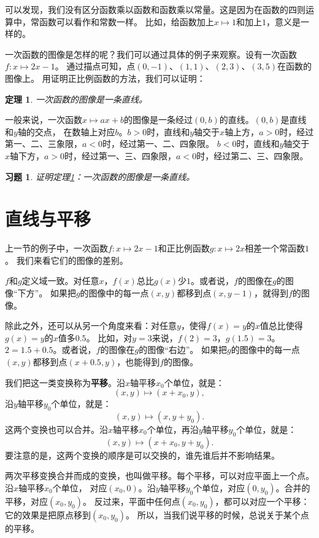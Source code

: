 \documentclass[12pt,UTF8]{ctexbook}
\newtheorem{tm}{定理}[section]
\newtheorem{xt}{习题}[section]
\begin{document}
可以发现，我们没有区分函数乘以函数和函数乘以常量。这是因为在函数的四则运算中，常函数可以看作和常数一样。
比如，给函数加上$x\mapsto 1$和加上$1$，意义是一样的。

一次函数的图像是怎样的呢？我们可以通过具体的例子来观察。设有一次函数$f: x\mapsto 2x - 1$。
通过描点可知，点$(0, -1)$、$(1, 1)$、$(2, 3)$、$(3, 5)$在函数的图像上。
用证明正比例函数的方法，我们可以证明：

\begin{tm}\label{tm:5-1-0}
    一次函数的图像是一条直线。
\end{tm}

一般来说，一次函数$x\mapsto ax + b$的图像是一条经过$(0, b)$的直线。$(0, b)$是直线和$y$轴的交点，
在数轴上对应$b$。$b>0$时，直线和$y$轴交于$x$轴上方，$a>0$时，经过第一、二、三象限，$a<0$时，经过第一、二、四象限。
$b<0$时，直线和$y$轴交于$x$轴下方，$a>0$时，经过第一、三、四象限，$a<0$时，经过第二、三、四象限。

\begin{xt}
    证明定理\ref{tm:5-1-0}：一次函数的图像是一条直线。
\end{xt}

\section{直线与平移}
上一节的例子中，一次函数$f: x\mapsto 2x - 1$和正比例函数$g: x\mapsto 2x$相差一个常函数$1$。
我们来看它们的图像的差别。

$f$和$g$定义域一致。对任意$x$，$f(x)$总比$g(x)$少$1$。或者说，$f$的图像在$g$的图像“下方”。
如果把$g$的图像中的每一点$(x, y)$都移到点$(x, y-1)$，就得到$f$的图像。

除此之外，还可以从另一个角度来看：对任意$y$，使得$f(x)=y$的$x$值总比使得$g(x)=y$的$x$值多$0.5$。
比如，对$y=3$来说，$f(2)=3$，$g(1.5)=3$。$2=1.5+0.5$。或者说，$f$的图像在$g$的图像“右边”。
如果把$g$的图像中的每一点$(x, y)$都移到点$(x+0.5, y)$，也能得到$f$的图像。

我们把这一类变换称为\textbf{平移}。沿$x$轴平移$x_0$个单位，就是：
$$ (x, y) \mapsto (x+x_0, y),$$
沿$y$轴平移$y_0$个单位，就是：
$$ (x, y) \mapsto (x, y+y_0).$$
这两个变换也可以合并。沿$x$轴平移$x_0$个单位，再沿$y$轴平移$y_0$个单位，就是：
$$ (x, y) \mapsto (x+x_0, y+y_0).$$
要注意的是，这两个变换的顺序是可以交换的，谁先谁后并不影响结果。

两次平移变换合并而成的变换，也叫做平移。每个平移，可以对应平面上一个点。沿$x$轴平移$x_0$个单位，
对应$(x_0, 0)$。沿$y$轴平移$y_0$个单位，对应$(0, y_0)$。合并的平移，对应$(x_0, y_0)$。
反过来，平面中任何点$(x_0, y_0)$，都可以对应一个平移：它的效果是把原点移到$(x_0, y_0)$。
所以，当我们说平移的时候，总说关于某个点的平移。
\end{document}
